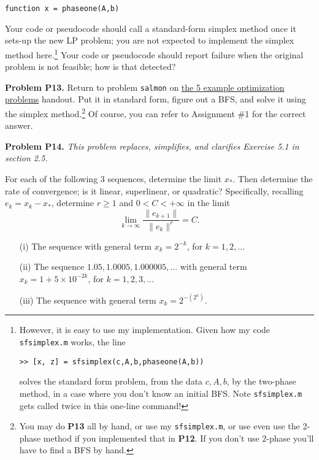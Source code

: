 \documentclass[12pt]{amsart}
\newcommand{\prob}[1]{\bigskip\noindent\textbf{#1}\quad }
\begin{document}
\centerline{\texttt{function x = phaseone(A,b)}}

\medskip
\noindent Your code or pseudocode should call a standard-form simplex method once it sets-up the new LP problem; you are not expected to implement the simplex method here.\footnote{However, it is easy to use my implementation.  Given how my code \texttt{sfsimplex.m} works, the line\par
\centerline{\texttt{>> [x, z] = sfsimplex(c,A,b,phaseone(A,b))}}\par
\noindent solves the standard form problem, from the data $c,A,b$, by the two-phase method, in a case where you don't know an initial BFS.  Note \texttt{sfsimplex.m} gets called twice in this one-line command!}  Your code or pseudocode should report failure when the original problem is not feasible; how is that detected?


\prob{Problem P13.}  Return to problem \texttt{salmon} on \href{https://bueler.github.io/opt/assets/worksheets/F24/5exs.pdf}{the 5 example optimization problems} handout.  Put it in standard form, figure out a BFS, and solve it using the simplex method.\footnote{You may do \textbf{P13} all by hand, or use my \texttt{sfsimplex.m}, or use even use the 2-phase method if you implemented that in \textbf{P12}.  If you don't use 2-phase you'll have to find a BFS by hand.}  Of course, you can refer to Assignment \#1 for the correct answer.


\prob{Problem P14.}  \emph{This problem replaces, simplifies, and clarifies Exercise 5.1 in section 2.5.}

\medskip \noindent For each of the following 3 sequences, determine the limit $x_*$.  Then determine the rate of convergence; is it linear, superlinear, or quadratic?  Specifically, recalling $e_k=x_k - x_*$, determine $r\ge 1$ and $0<C<+\infty$ in the limit
    $$\lim_{k\to\infty} \frac{\|e_{k+1}\|}{\|e_k\|^r} = C.$$

\begin{itemize}
\item[(i)] The sequence with general term $x_k = 2^{-k}$, for $k=1,2,\dots$
\item[(ii)] The sequence $1.05, 1.0005, 1.000005, \dots$ with general term $x_k = 1 + 5 \times 10^{-2k}$, for $k=1,2,3,\dots$
\item[(iii)] The sequence with general term $\displaystyle x_k = 2^{-(2^k)}$.
\end{itemize}

\end{document}
